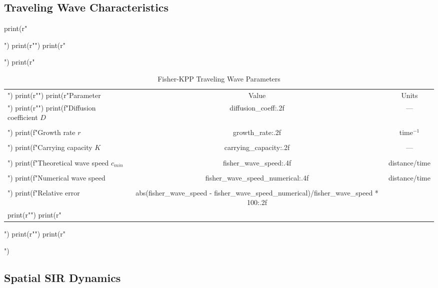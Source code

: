 \documentclass[a4paper, 11pt]{article}
\begin{document}
\subsection{Traveling Wave Characteristics}

\begin{pycode}
print(r"\begin{table}[htbp]")
print(r"\centering")
print(r"\caption{Fisher-KPP Traveling Wave Parameters}")
print(r"\begin{tabular}{lcc}")
print(r"\toprule")
print(r"Parameter & Value & Units \\")
print(r"\midrule")
print(f"Diffusion coefficient $D$ & {diffusion_coeff:.2f} & --- \\\\")
print(f"Growth rate $r$ & {growth_rate:.2f} & time$^{{-1}}$ \\\\")
print(f"Carrying capacity $K$ & {carrying_capacity:.2f} & --- \\\\")
print(f"Theoretical wave speed $c_{{min}}$ & {fisher_wave_speed:.4f} & distance/time \\\\")
print(f"Numerical wave speed & {fisher_wave_speed_numerical:.4f} & distance/time \\\\")
print(f"Relative error & {abs(fisher_wave_speed - fisher_wave_speed_numerical)/fisher_wave_speed * 100:.2f} & \\%
print(r"\bottomrule")
print(r"\end{tabular}")
print(r"\label{tab:fisher_kpp}")
print(r"\end{table}")
\end{pycode}

\subsection{Spatial SIR Dynamics}
\end{document}

